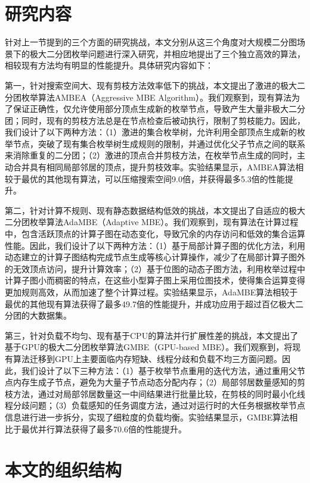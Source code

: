 \section{研究内容}



针对上一节提到的三个方面的研究挑战，本文分别从这三个角度对大规模二分图场景下的极大二分团枚举问题进行深入研究，并相应地提出了三个独立高效的算法，相较现有方法均有明显的性能提升。具体研究内容如下：

第一，针对搜索空间大、现有剪枝方法效率低下的挑战，本文提出了激进的极大二分团枚举算法AMBEA（Aggressive MBE Algorithm）。我们观察到，现有算法为了保证正确性，仅允许使用部分顶点生成新的枚举节点，导致产生大量非极大二分团；同时，现有的剪枝方法总是在节点检查后被动执行，限制了剪枝能力。因此，我们设计了以下两种方法：（1）激进的集合枚举树，允许利用全部顶点生成新的枚举节点，突破了现有集合枚举树生成规则的限制，并通过优化父子节点之间的联系来消除重复的二分团；（2）激进的顶点合并剪枝方法，在枚举节点生成的同时，主动合并具有相同局部邻居的顶点，提升剪枝效率。实验结果显示，AMBEA算法相较于最优的其他现有算法，可以压缩搜索空间9.0倍，并获得最多5.3倍的性能提升。

第二，针对计算不规则、现有静态数据结构低效的挑战，本文提出了自适应的极大二分团枚举算法AdaMBE（Adaptive MBE）。我们观察到，现有算法在计算过程中，包含活跃顶点的计算子图在动态变化，导致冗余的内存访问和低效的集合运算性能。因此，我们设计了以下两种方法：（1）基于局部计算子图的优化方法，利用动态建立的计算子图结构完成节点生成等核心计算操作，减少了在局部计算子图外的无效顶点访问，提升计算效率；（2）基于位图的动态子图方法，利用枚举过程中计算子图小而稠密的特点，在这些小型算子图上采用位图技术，使得集合运算变得更加规则高效，从而加速了整个计算过程。实验结果显示，AdaMBE算法相较于最优的其他现有算法获得了最多49.7倍的性能提升，并成功应用于超过百亿极大二分团的大数据集。

第三，针对负载不均匀、现有基于CPU的算法并行扩展性差的挑战，本文提出了基于GPU的极大二分团枚举算法GMBE（GPU-based MBE）。我们观察到，将现有算法迁移到GPU上主要面临内存短缺、线程分歧和负载不均三方面问题。因此，我们设计了以下三种方法：（1）基于枚举节点重用的迭代方法，通过重用父节点内存生成子节点，避免为大量子节点动态分配内存；（2）局部邻居数量感知的剪枝方法，通过对局部邻居数量这一中间结果进行批量比较，在剪枝的同时最小化线程分歧问题；（3）负载感知的任务调度方法，通过对运行时的大任务根据枚举节点信息进行进一步拆分，实现了细粒度的负载均衡。实验结果显示，GMBE算法相比于最优并行算法获得了最多70.6倍的性能提升。




\section{本文的组织结构}

